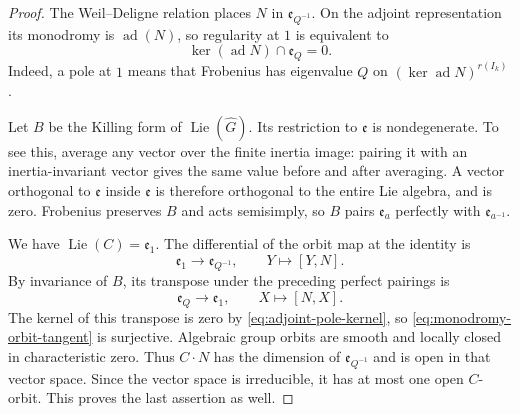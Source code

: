 \begin{proof}
The Weil--Deligne relation places $N$ in
$\mathfrak e_{Q^{-1}}$.  On the adjoint representation its
monodromy is $\operatorname{ad}(N)$, so regularity at $1$ is
equivalent to
\begin{equation}\label{eq:adjoint-pole-kernel}
 \ker(\operatorname{ad}N)\cap\mathfrak e_Q=0.
\end{equation}
Indeed, a pole at $1$ means that Frobenius has eigenvalue $Q$ on
$(\ker\operatorname{ad}N)^{r(I_k)}$.

Let $B$ be the Killing form of $\operatorname{Lie}(\widehat G)$.
Its restriction to $\mathfrak e$ is nondegenerate.  To see this,
average any vector over the finite inertia image: pairing it with
an inertia-invariant vector gives the same value before and after
averaging.  A vector orthogonal to $\mathfrak e$ inside
$\mathfrak e$ is therefore orthogonal to the entire Lie algebra,
and is zero.  Frobenius preserves $B$ and acts semisimply, so $B$
pairs $\mathfrak e_a$ perfectly with $\mathfrak e_{a^{-1}}$.

We have $\operatorname{Lie}(C)=\mathfrak e_1$.  The differential
of the orbit map at the identity is
\begin{equation}\label{eq:monodromy-orbit-tangent}
 \mathfrak e_1\longrightarrow\mathfrak e_{Q^{-1}},
 \qquad Y\longmapsto[Y,N].
\end{equation}
By invariance of $B$, its transpose under the preceding perfect
pairings is
\[
 \mathfrak e_Q\longrightarrow\mathfrak e_1,
 \qquad X\longmapsto[N,X].
\]
The kernel of this transpose is zero by
\eqref{eq:adjoint-pole-kernel}, so
\eqref{eq:monodromy-orbit-tangent} is surjective.  Algebraic group
orbits are smooth and locally closed in characteristic zero.
Thus $C\cdot N$ has the dimension of $\mathfrak e_{Q^{-1}}$ and
is open in that vector space.  Since the vector space is
irreducible, it has at most one open $C$-orbit.  This proves the
last assertion as well.
\end{proof}
